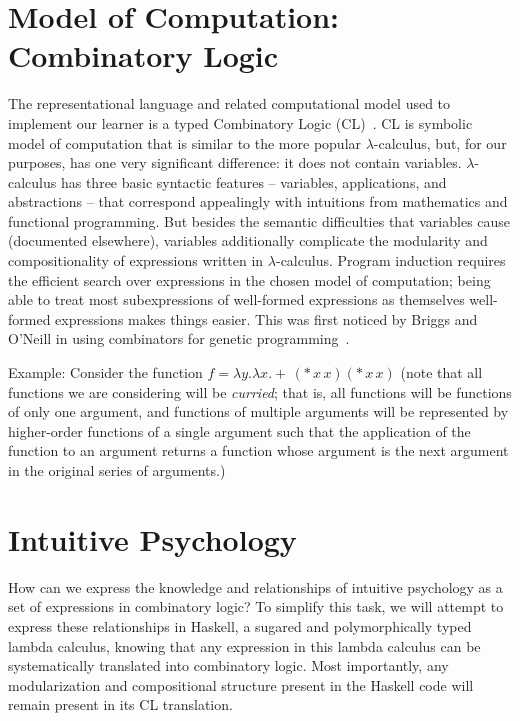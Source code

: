 \documentclass{article}
\begin{document}
\section{Model of Computation: Combinatory Logic}
The representational language and related computational model used to
implement our learner is a typed Combinatory Logic
(CL)~\cite{hindley1972introduction}. CL is symbolic model of
computation that is similar to the more popular $\lambda$-calculus,
but, for our purposes, has one very significant difference: it does
not contain variables. $\lambda$-calculus has three basic syntactic
features -- variables, applications, and abstractions -- that
correspond appealingly with intuitions from mathematics and functional
programming. But besides the semantic difficulties that variables
cause (documented elsewhere), variables additionally complicate the
modularity and compositionality of expressions written in
$\lambda$-calculus. Program induction requires the efficient search
over expressions in the chosen model of computation; being able to
treat most subexpressions of well-formed expressions as themselves
well-formed expressions makes things easier. This was first noticed by
Briggs and O'Neill in using combinators for genetic
programming~\cite{briggs2006functioinal}. 

Example: Consider the function $f = \lambda y. \lambda x. +\,
(*\, x\, x) (*\, x\, x)$ (note that all functions we are considering
will be \emph{curried}; that is, all functions will be functions of
only one argument, and functions of multiple arguments will be
represented by higher-order functions of a single argument such that
the application of the function to an argument returns a function
whose argument is the next argument in the original series of
arguments.)



\section{Intuitive Psychology}
How can we express the knowledge and relationships of intuitive
psychology as a set of expressions in combinatory logic? To simplify
this task, we will attempt to express these relationships in Haskell,
a sugared and polymorphically typed lambda calculus, knowing that any
expression in this lambda calculus can be systematically translated
into combinatory logic. Most importantly, any modularization and
compositional structure present in the Haskell code will remain
present in its CL translation.
\end{document}

